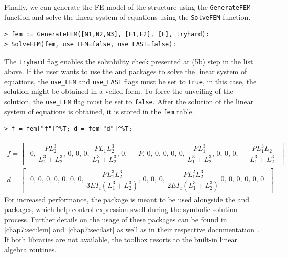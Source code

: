 Finally, we can generate the \ac{FE} model of the structure using the \texttt{GenerateFEM} function and solve the linear system of equations using the \texttt{SolveFEM} function.
%
\begin{verbatim}
> fem := GenerateFEM([N1,N2,N3], [E1,E2], [F], tryhard):
> SolveFEM(fem, use_LEM=false, use_LAST=false):
\end{verbatim}
%
The \texttt{tryhard} flag enables the solvability check presented at (5b) step in the list above. If the user wants to use the \LEM{} and \LAST{} packages to solve the linear system of equations, the \texttt{use\_LEM} and \texttt{use\_LAST} flags must be set to \texttt{true}, in this case, the solution might be obtained in a veiled form. To force the unveiling of the solution, the \texttt{use\_LEM} flag must be set to \texttt{false}. After the solution of the linear system of equations is obtained, it is stored in the \texttt{fem} table.
%
\begin{verbatim}
> f = fem["f"]^%T; d = fem["d"]^%T;
\end{verbatim}
\begin{equation*}
  \begin{matrix}
    f = \left[\,\begin{matrix}
      \, 0, \, \dfrac{PL_2^3}{L_1^3+L_2^3}, \, 0, \, 0, \, 0, \, \dfrac{PL_1L_2^3}{L_1^3+L_2^3}, \, 0, \, -P, \, 0, \, 0, \, 0, \, 0, \, 0, \, \dfrac{PL_1^3}{L_1^3+L_2^3}, \, 0, \, 0, \, 0, \, -\dfrac{PL_1^3L_2}{L_1^3+L_2^3} \,
    \end{matrix}\,\right] \\[1.5em]
    d = \left[\,\begin{matrix}
      \, 0, \, 0, \, 0, \, 0, \, 0, \, 0, \, 0, \, \dfrac{PL_1^3L_2^3}{3EI_z(L_1^3+L_2^3)}, \, 0, \, 0, \, 0, \, \dfrac{PL_1^2L_2^3}{2EI_z(L_1^3+L_2^3)} \, 0, \, 0, \, 0, \, 0, \, 0, \, 0 \,
    \end{matrix}\,\right]
  \end{matrix}
\end{equation*}
%
For increased performance, the \TrussMe{} package is meant to be used alongside the \LEM{} and \LAST{} packages, which help control expression swell during the symbolic solution process. Further details on the usage of these packages can be found in \ref{chap7:sec:lem} and~\ref{chap7:sec:last} as well as in their respective documentation~\cite{lem2023source, last}. If both libraries are not available, the toolbox resorts to the \Maple{} built-in linear algebra routines.


